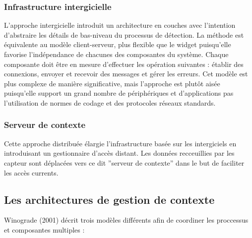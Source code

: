 \subsubsection{Infrastructure intergicielle}

L'approche intergicielle introduit un architecture en couches avec l'intention
d'abstraire les détails de bas-niveau du processus de détection. La méthode est
équivalente au modèle client-serveur, plus flexible que le widget puisqu'elle
favorise l'indépendance de chacunes des composantes du système. Chaque
composante doit être en mesure d'effectuer les opération suivantes : établir des
connexions, envoyer et recevoir des messages et gérer les erreurs. Cet modèle
est plus complexe de manière significative, mais l'approche est plutôt aisée
puisqu'elle support un grand nombre de périphériques et d'applications pas
l'utilisation de normes de codage et des protocoles réseaux standards.

\subsubsection{Serveur de contexte}

Cette approche distribuée élargie l'infrastructure basée sur les intergiciels en
introduisant un gestionnaire d'accès distant. Les données recceuillies par les
capteur sont déplacées vers ce dit ''serveur de contexte'' dans le but de
faciliter les accès currents.

\subsection{Les architectures de gestion de contexte}

Winograde (2001) \cite{winograd_architectures_2001} décrit trois modèles
différents afin de coordiner les proccessus et composantes multiples :


